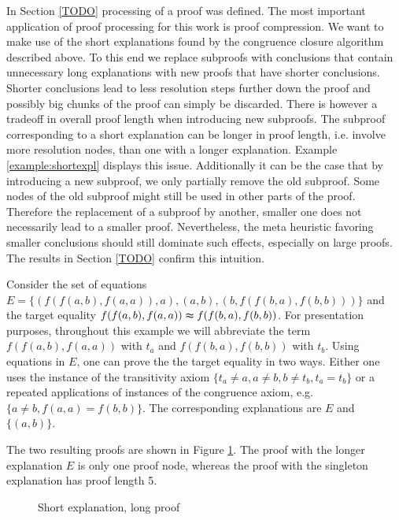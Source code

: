 In Section \ref{TODO} processing of a proof was defined.
The most important application of proof processing for this work is proof compression.
We want to make use of the short explanations found by the congruence closure algorithm described above.
To this end we replace subproofs with conclusions that contain unnecessary long explanations with new proofs that have shorter conclusions.
Shorter conclusions lead to less resolution steps further down the proof and possibly big chunks of the proof can simply be discarded.
There is however a tradeoff in overall proof length when introducing new subproofs.
The subproof corresponding to a short explanation can be longer in proof length, i.e. involve more resolution nodes, than one with a longer explanation.
Example \ref{example:shortexpl} displays this issue.
Additionally it can be the case that by introducing a new subproof, we only partially remove the old subproof.
Some nodes of the old subproof might still be used in other parts of the proof.
Therefore the replacement of a subproof by another, smaller one does not necessarily lead to a smaller proof.
Nevertheless, the meta heuristic favoring smaller conclusions should still dominate such effects, especially on large proofs.
The results in Section \ref{TODO} confirm this intuition.

\begin{example}
\label{example:shortexpl}
Consider the set of equations $E = \{(f(f(a,b),f(a,a)),a),(a,b),(b,f(f(b,a),f(b,b)))\}$ and the target equality $f(f(a,b),f(a,a)) \thickapprox f(f(b,a),f(b,b))$.
For presentation purposes, throughout this example we will abbreviate the term $f(f(a,b),f(a,a))$ with $t_a$ and $f(f(b,a),f(b,b))$ with $t_b$.
Using equations in $E$, one can prove the the target equality in two ways.
Either one uses the instance of the transitivity axiom $\{t_a \neq a, a \neq b, b \neq t_b, t_a = t_b\}$ or a repeated applications of instances of the congruence axiom, e.g. $\{a \neq b, f(a,a) = f(b,b)\}$.
The corresponding explanations are $E$ and $\{(a,b)\}$.

The two resulting proofs are shown in Figure \ref{fig:short_expl_proof}.
The proof with the longer explanation $E$ is only one proof node, whereas the proof with the singleton explanation has proof length 5.

%
%
%

\begin{figure}[!h]
%
\caption{Short explanation, long proof}
\label{fig:short_expl_proof}
\end{figure}

\end{example}

